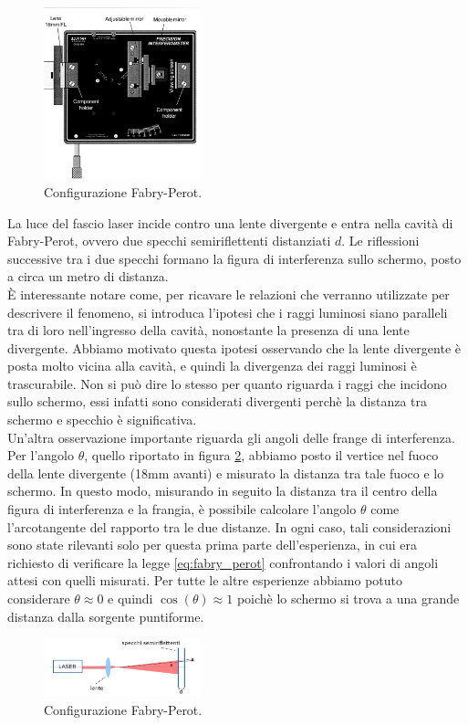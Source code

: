 \documentclass[letterpaper,12pt]{article}
\begin{document}
\begin{figure}[ht]
    \centering
    \includegraphics[width=0.4\textwidth]{InterferometroFabry.png}
    \caption{Configurazione Fabry-Perot.}
    \label{fig:fabry-perot config}
\end{figure}

La luce del fascio laser incide contro una lente divergente e entra nella cavità di Fabry-Perot, ovvero due specchi semiriflettenti 
distanziati $d$. Le riflessioni successive tra i due specchi formano la figura di interferenza sullo schermo, posto
a circa un metro di distanza. \\ 
È interessante notare come, per ricavare le relazioni che verranno utilizzate per descrivere il fenomeno, si 
introduca l'ipotesi che i raggi luminosi siano paralleli tra di loro nell'ingresso della cavità, nonostante la 
presenza di una lente divergente. Abbiamo motivato questa ipotesi osservando che la lente divergente è posta
molto vicina alla cavità, e quindi la divergenza dei raggi luminosi è trascurabile. Non si può dire lo stesso per 
quanto riguarda i raggi che incidono sullo schermo, essi infatti sono considerati divergenti perchè la distanza tra
schermo e specchio è significativa.\\
Un'altra osservazione importante riguarda gli angoli delle frange di interferenza. 
Per l'angolo $\theta$, quello riportato in figura \ref{fig:fabry_perot_scheda}, 
abbiamo posto il vertice nel fuoco della lente divergente (18mm avanti) e misurato la distanza tra tale fuoco e lo schermo. 
In questo modo, misurando in seguito la distanza tra il centro della figura di interferenza e la frangia, 
è possibile calcolare l'angolo $\theta$ come l'arcotangente del rapporto tra le due distanze. In ogni caso, tali 
considerazioni sono state rilevanti solo per questa prima parte dell'esperienza, in cui era richiesto di verificare 
la legge \ref{eq:fabry_perot} confrontando i valori di angoli attesi con quelli misurati. Per tutte le altre esperienze 
abbiamo potuto considerare $\theta \approx 0$ e quindi $\cos(\theta) \approx 1$ poichè lo schermo si trova 
a una grande distanza dalla sorgente puntiforme.
\begin{figure}[h!]
    \centering
    \includegraphics[width=0.4\textwidth]{fabry_perot_config.JPG}
    \caption{Configurazione Fabry-Perot.}
    \label{fig:fabry_perot_scheda}
\end{figure}
\end{document}
